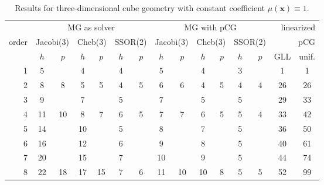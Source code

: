 \documentclass[smallcondensed,final]{svjour3}     %
\newcommand{\bs}[1]{\ensuremath{\boldsymbol #1}}
\begin{document}
\begin{table}
  \caption{\label{tab:3d-box} Results for three-dimensional cube geometry
    with constant coefficient $\mu(\bs x) \equiv 1$.}
  \centering
  \begin{tabular}{|r|c c|c c|c c||c c|c c|c c||c c|} 
    \hline
    & \multicolumn{6}{c||}{MG as solver} & \multicolumn{6}{c||}{MG with pCG} & \multicolumn{2}{r|}{linearized} \\
    \cline{2-13}
    \!\!\! order \!\!\!\! &  \multicolumn{2}{c|}{\!\scriptsize  Jacobi(3)\!} &  \multicolumn{2}{c|}{\!\scriptsize Cheb(3)\!} & \multicolumn{2}{c||}{\!\scriptsize  SSOR(2)\!} & \multicolumn{2}{c|}{\!\scriptsize Jacobi(3)\!} &  \multicolumn{2}{c|}{\!\scriptsize Cheb(3)\!} & \multicolumn{2}{c||}{\!\scriptsize SSOR(2)\!} & \multicolumn{2}{r|}{pCG}\\
\hline
 & $h$ & $p$ & $h$ & $p$& $h$ & $p$& $h$ & $p$& $h$ & $p$& $h$ & $p$& GLL & unif.\\
 \cline{2-15}
1 & 5 & & 4 & & 4 & & 5 & & 4 & & 3 & & 1 & 1  \\
2 & 8 & 8 & 5 & 5 & 4 & 5 & 6 & 6 & 4 & 5 & 4 & 4 & 26 & 26 \\
3 & 9 & & 7 & & 5 & & 7 & & 5 & & 5 & & 29 & 33  \\
4 & 11 & 10 & 8 & 7 & 6 & 5 & 7 & 7 & 6 & 5 & 5 & 4 & 33 & 42 \\
\hline
5 & 14 & & 10 & & 5 & & 8 & & 7 & & 5 & & 36 & 50  \\
6 & 16 & & 12 & & 6 & & 9 & & 8 & & 5 & & 40 & 61  \\
7 & 20 & & 15 & & 7 & & 10 & & 9 & & 5 & & 44 & 74  \\
8 & 22 & 18 & 17 & 15 & 7 & 6 & 11 & 10 & 10 & 8 & 5 & 5 & 52 & 99 \\
\hline
  \end{tabular}
\end{table}
\end{document}

